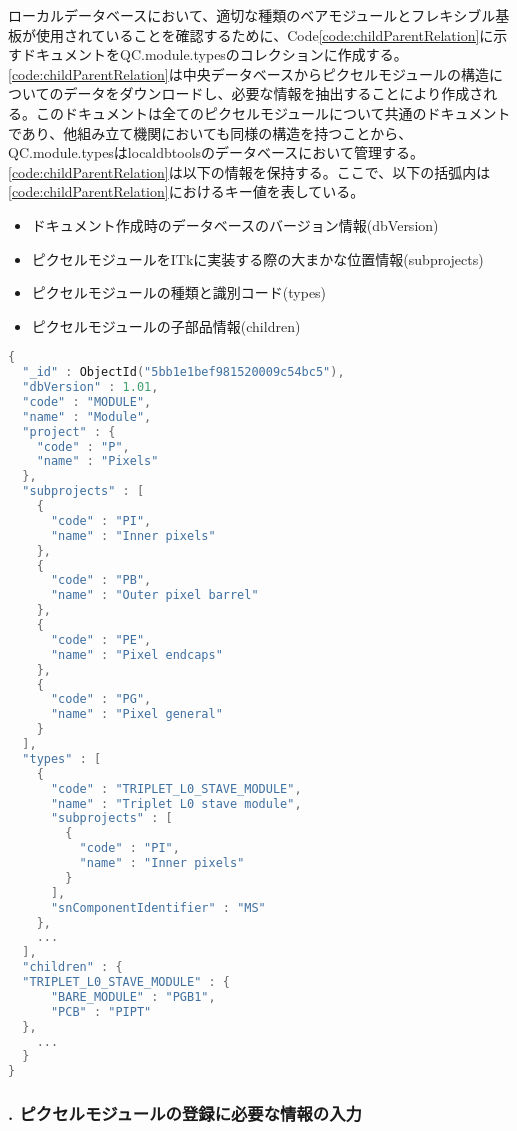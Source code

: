 ローカルデータベースにおいて、適切な種類のベアモジュールとフレキシブル基板が使用されていることを確認するために、Code\ref{code:childParentRelation}に示すドキュメントをQC.module.typesのコレクションに作成する。
\cref{code:childParentRelation}は中央データベースからピクセルモジュールの構造についてのデータをダウンロードし、必要な情報を抽出することにより作成される。このドキュメントは全てのピクセルモジュールについて共通のドキュメントであり、他組み立て機関においても同様の構造を持つことから、 QC.module.typesはlocaldbtoolsのデータベースにおいて管理する。\cref{code:childParentRelation}は以下の情報を保持する。ここで、以下の括弧内は\cref{code:childParentRelation}におけるキー値を表している。
\begin{itemize}
  \item ドキュメント作成時のデータベースのバージョン情報(dbVersion)
  \item ピクセルモジュールをITkに実装する際の大まかな位置情報(subprojects)
  \item ピクセルモジュールの種類と識別コード(types)
  \item ピクセルモジュールの子部品情報(children)
\end{itemize}

\begin{lstlisting}[caption=ピクセルモジュールの種類と各部品の親子関係を管理するためのドキュメント。,label=code:childParentRelation, language=C++]
{
  "_id" : ObjectId("5bb1e1bef981520009c54bc5"),
  "dbVersion" : 1.01,
  "code" : "MODULE",
  "name" : "Module",
  "project" : {
    "code" : "P",
    "name" : "Pixels"
  },
  "subprojects" : [
    {
      "code" : "PI",
      "name" : "Inner pixels"
    },
    {
      "code" : "PB",
      "name" : "Outer pixel barrel"
    },
    {
      "code" : "PE",
      "name" : "Pixel endcaps"
    },
    {
      "code" : "PG",
      "name" : "Pixel general"
    }
  ],
  "types" : [
    {
      "code" : "TRIPLET_L0_STAVE_MODULE",
      "name" : "Triplet L0 stave module",
      "subprojects" : [
        {
          "code" : "PI",
          "name" : "Inner pixels"
        }
      ],
      "snComponentIdentifier" : "MS"
    },
    ...
  ],
  "children" : {
  "TRIPLET_L0_STAVE_MODULE" : {
	  "BARE_MODULE" : "PGB1",
	  "PCB" : "PIPT"
  },
    ...
  }
}
\end{lstlisting}

\subsubsection{. ピクセルモジュールの登録に必要な情報の入力}

